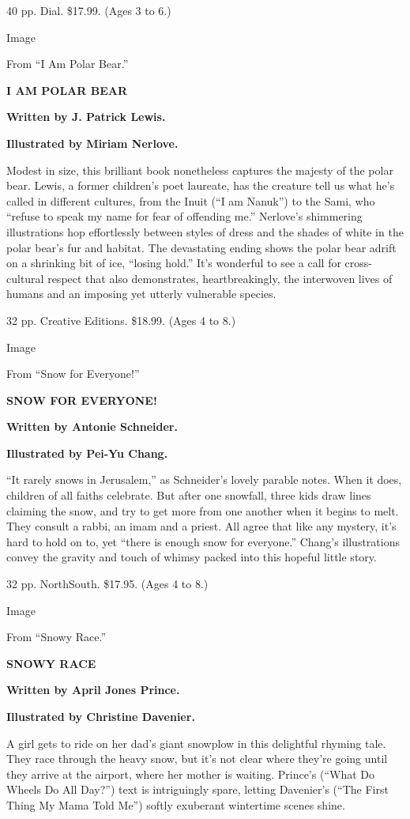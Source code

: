 40 pp. Dial. \$17.99. (Ages 3 to 6.)

Image

From ``I Am Polar Bear.''

\textbf{I AM POLAR BEAR}

\textbf{Written by J. Patrick Lewis.}

\textbf{Illustrated by Miriam Nerlove.}

Modest in size, this brilliant book nonetheless captures the majesty of
the polar bear. Lewis, a former children's poet laureate, has the
creature tell us what he's called in different cultures, from the Inuit
(``I am Nanuk'') to the Sami, who ``refuse to speak my name for fear of
offending me.'' Nerlove's shimmering illustrations hop effortlessly
between styles of dress and the shades of white in the polar bear's fur
and habitat. The devastating ending shows the polar bear adrift on a
shrinking bit of ice, ``losing hold.'' It's wonderful to see a call for
cross-cultural respect that also demonstrates, heartbreakingly, the
interwoven lives of humans and an imposing yet utterly vulnerable
species.

32 pp. Creative Editions. \$18.99. (Ages 4 to 8.)

Image

From ``Snow for Everyone!''

\textbf{SNOW FOR EVERYONE!}

\textbf{Written by Antonie Schneider.}

\textbf{Illustrated by Pei-Yu Chang.}

``It rarely snows in Jerusalem,'' as Schneider's lovely parable notes.
When it does, children of all faiths celebrate. But after one snowfall,
three kids draw lines claiming the snow, and try to get more from one
another when it begins to melt. They consult a rabbi, an imam and a
priest. All agree that like any mystery, it's hard to hold on to, yet
``there is enough snow for everyone.'' Chang's illustrations convey the
gravity and touch of whimsy packed into this hopeful little story.

32 pp. NorthSouth. \$17.95. (Ages 4 to 8.)

Image

From ``Snowy Race.''

\textbf{SNOWY RACE}

\textbf{Written by April Jones Prince.}

\textbf{Illustrated by Christine Davenier.}

A girl gets to ride on her dad's giant snowplow in this delightful
rhyming tale. They race through the heavy snow, but it's not clear where
they're going until they arrive at the airport, where her mother is
waiting. Prince's (``What Do Wheels Do All Day?'') text is intriguingly
spare, letting Davenier's (``The First Thing My Mama Told Me'') softly
exuberant wintertime scenes shine.

